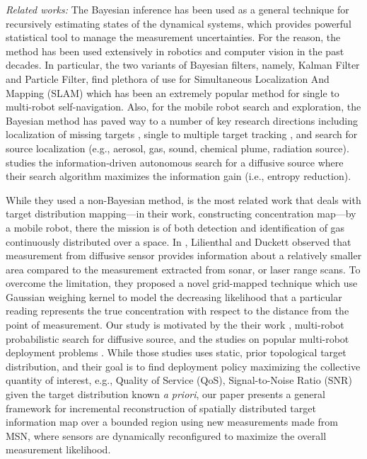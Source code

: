 \documentclass[journal]{IEEEtran}
\begin{document}
\textit{Related works:} The Bayesian inference has been used as a general technique for recursively estimating states of the dynamical systems, which provides powerful statistical tool to manage the measurement uncertainties.
For the reason, the method has been used extensively in robotics \cite{thrun2005probabilistic} and computer vision \cite{ponce2011computer} in the past decades. In particular, the two variants of Bayesian filters, namely, Kalman Filter and Particle Filter, find plethora of use for Simultaneous Localization And Mapping (SLAM) which has been an extremely popular method for single to multi-robot self-navigation.
Also, for the mobile robot search and exploration, the Bayesian method has paved way to a number of key research directions including
localization of missing targets \cite{bourgault2003coordinated}, single to multiple target tracking \cite{stone2013bayesian}, and 
search for source localization \cite{ristic2010information,valin2007robust} (e.g., aerosol, gas, sound, chemical plume, radiation source). 
\cite{ristic2010information} studies the information-driven autonomous search for a diffusive source
where their search algorithm maximizes the information gain (i.e., entropy reduction).

While they used a non-Bayesian method, \cite{lilienthal2009statistical} is the most related work that deals with target distribution mapping---in their work, constructing concentration map---by a mobile robot, there the mission is of both detection and identification of gas continuously distributed over a space. In \cite{lilienthal2009statistical}, Lilienthal and Duckett observed that measurement from diffusive sensor provides information about a relatively smaller area compared to the measurement extracted from sonar, or laser range scans. To overcome the limitation, they proposed a novel grid-mapped technique which use Gaussian weighing kernel to model the decreasing likelihood that a particular reading represents the true concentration with respect to the distance from the point of measurement.
Our study is motivated by the their work \cite{lilienthal2009statistical}, multi-robot probabilistic search for diffusive source, and the studies on popular multi-robot deployment problems \cite{cortes_coverage_2004}. 
While those studies \cite{cortes_coverage_2004} uses static, prior topological target distribution, and their goal is to find deployment policy maximizing the collective quantity of interest, e.g., Quality of Service (QoS), Signal-to-Noise Ratio (SNR)  given the target distribution known \emph{a priori}, our paper presents a general framework for incremental reconstruction of spatially distributed target information map over a bounded region using new measurements made from MSN, where sensors are dynamically reconfigured to maximize the overall measurement likelihood.
\end{document}
